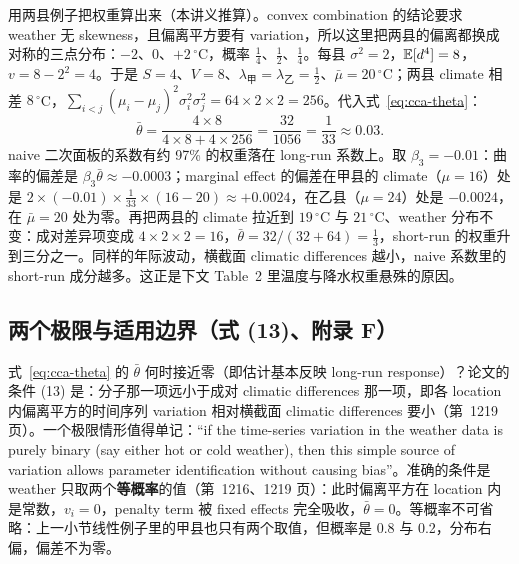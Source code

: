用两县例子把权重算出来（本讲义推算）。convex combination 的结论要求 weather 无 skewness，且偏离平方要有 variation，所以这里把两县的偏离都换成对称的三点分布：$-2$、$0$、$+2\,^\circ$C，概率 $\tfrac14$、$\tfrac12$、$\tfrac14$。每县 $\sigma^2=2$，$\mathbb{E}[d^4]=8$，$v=8-2^2=4$。于是 $S=4$、$V=8$、$\lambda_{\text{甲}}=\lambda_{\text{乙}}=\tfrac12$、$\bar\mu=20\,^\circ$C；两县 climate 相差 $8\,^\circ$C，$\sum_{i<j}(\mu_i-\mu_j)^2\sigma_i^2\sigma_j^2=64\times2\times2=256$。代入式~\ref{eq:cca-theta}：
\begin{equation*}
\bar\theta=\frac{4\times8}{4\times8+4\times256}=\frac{32}{1056}=\frac{1}{33}\approx0.03 .
\end{equation*}
naive 二次面板的系数有约 97\% 的权重落在 long-run 系数上。取 $\beta_3=-0.01$：曲率的偏差是 $\beta_3\bar\theta\approx-0.0003$；marginal effect 的偏差在甲县的 climate（$\mu=16$）处是 $2\times(-0.01)\times\tfrac{1}{33}\times(16-20)\approx+0.0024$，在乙县（$\mu=24$）处是 $-0.0024$，在 $\bar\mu=20$ 处为零。再把两县的 climate 拉近到 $19\,^\circ$C 与 $21\,^\circ$C、weather 分布不变：成对差异项变成 $4\times2\times2=16$，$\bar\theta=32/(32+64)=\tfrac13$，short-run 的权重升到三分之一。同样的年际波动，横截面 climatic differences 越小，naive 系数里的 short-run 成分越多。这正是下文 Table~2 里温度与降水权重悬殊的原因。

\subsection{两个极限与适用边界（式 (13)、附录 F）}

式~\ref{eq:cca-theta} 的 $\bar\theta$ 何时接近零（即估计基本反映 long-run response）？论文的条件 (13) 是：分子那一项远小于成对 climatic differences 那一项，即各 location 内偏离平方的时间序列 variation 相对横截面 climatic differences 要小（第~1219 页）。一个极限情形值得单记：``if the time-series variation in the weather data is purely binary (say either hot or cold weather), then this simple source of variation allows parameter identification without causing bias''\citep[第~1219 页]{merel2021climate}。准确的条件是 weather 只取两个\textbf{等概率}的值（第~1216、1219 页）：此时偏离平方在 location 内是常数，$v_i=0$，penalty term 被 fixed effects 完全吸收，$\bar\theta=0$。等概率不可省略：上一小节线性例子里的甲县也只有两个取值，但概率是 0.8 与 0.2，分布右偏，偏差不为零。

